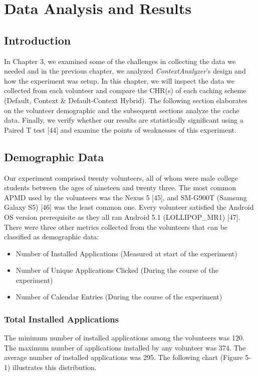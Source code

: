 \documentclass[12pt]{uthesis-v12}  %
\begin{document}
\chapter{Data Analysis and Results}

		\section{Introduction}
			In Chapter 3, we examined some of the challenges in collecting the data we needed and in the previous chapter, we analyzed {\em ContextAnalyzer}'s design and how the experiment was setup. In this chapter, we will inspect the data we collected from each volunteer and compare the CHR(s) of each caching scheme (Default, Context \& Default-Context Hybrid). The following section elaborates on the volunteer demographic and the subsequent sections analyze the cache data. Finally, we verify whether our results are statistically significant using a Paired T test [44] and examine the points of weaknesses of this experiment.
			
		\section{Demographic Data}
			Our experiment comprised twenty volunteers, all of whom were male college students between the ages of nineteen and twenty three. The most common APMD used by the volunteers was the Nexus 5 [45], and SM-G900T (Samsung Galaxy S5) [46] was the least common one. Every volunteer satisfied the Android OS version prerequisite as they all ran Android 5.1 (LOLLIPOP\_MR1) [47]. There were three other metrics  collected from the volunteers that can be classified as demographic data:
			
			\begin{itemize}
				\item Number of Installed Applications (Measured at start of the experiment)
				\item Number of Unique Applications Clicked (During the course of the experiment)
				\item Number of Calendar Entries (During the course of the experiment)
			\end{itemize} 
			
			\subsection{Total Installed Applications}
				The minimum number of installed applications among the volunteers was 120. The maximum number of applications installed by any volunteer was 374. The average number of installed applications was 295. The following chart (Figure 5-1) illustrates this distribution. 
				
\end{document}
